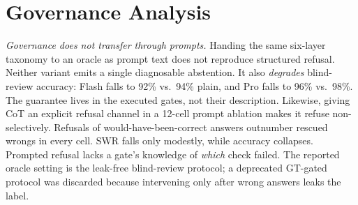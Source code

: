 \section{Governance Analysis}\label{sec:analysis}

\emph{Governance does not transfer through prompts.} Handing the same six-layer taxonomy to an oracle as prompt text does not reproduce structured refusal.
Neither variant emits a single diagnosable abstention.
It also \emph{degrades} blind-review accuracy: Flash falls to 92\% vs.\ 94\% plain, and Pro falls to 96\% vs.\ 98\%.
The guarantee lives in the executed gates, not their description.
Likewise, giving CoT an explicit refusal channel in a 12-cell prompt ablation makes it refuse non-selectively.
Refusals of would-have-been-correct answers outnumber rescued wrongs in every cell.
SWR falls only modestly, while accuracy collapses.
Prompted refusal lacks a gate's knowledge of \emph{which} check failed.
The reported oracle setting is the leak-free blind-review protocol; a deprecated GT-gated protocol was discarded because intervening only after wrong answers leaks the label.

